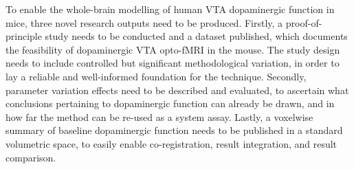 To enable the whole-brain modelling of human VTA dopaminergic function in mice, three novel research outputs need to be produced.
Firstly, a proof-of-principle study needs to be conducted and a dataset published, which documents the feasibility of dopaminergic VTA opto-fMRI in the mouse.
The study design needs to include controlled but significant methodological variation, in order to lay a reliable and well-informed foundation for the technique.
Secondly, parameter variation effects need to be described and evaluated, to ascertain what conclusions pertaining to dopaminergic function can already be drawn, and in how far the method can be re-used as a system assay.
Lastly, a voxelwise summary of baseline dopaminergic function needs to be published in a standard volumetric space, to easily enable co-registration, result integration, and result comparison.
